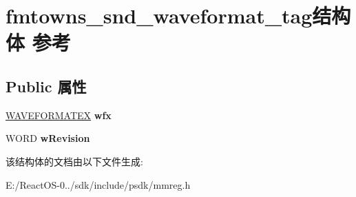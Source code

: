 \hypertarget{structfmtowns__snd__waveformat__tag}{}\section{fmtowns\+\_\+snd\+\_\+waveformat\+\_\+tag结构体 参考}
\label{structfmtowns__snd__waveformat__tag}
\subsection*{Public 属性}
\begin{DoxyCompactItemize}
\item 
\mbox{\label{structfmtowns__snd__waveformat__tag_a38f7e9af91e41701c57577409d29a95b}} 
\hyperlink{struct_w_a_v_e_f_o_r_m_a_t_e_x}{W\+A\+V\+E\+F\+O\+R\+M\+A\+T\+EX} {\bfseries wfx}
\item 
\mbox{\label{structfmtowns__snd__waveformat__tag_ad032f0e802f4be9f0c16224e450679d0}} 
W\+O\+RD {\bfseries w\+Revision}
\end{DoxyCompactItemize}


该结构体的文档由以下文件生成\+:\begin{DoxyCompactItemize}
\item 
E\+:/\+React\+O\+S-\/0../sdk/include/psdk/mmreg.\+h\end{DoxyCompactItemize}
